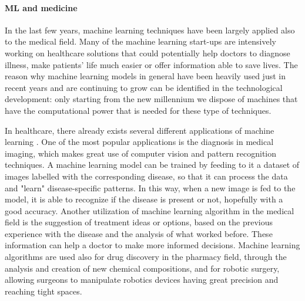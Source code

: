 \paragraph{ML and medicine} In the last few years, machine learning techniques have been largely applied also to the medical field. Many of the machine learning start-ups are intensively working on healthcare solutions that could potentially help doctors to diagnose illness, make patients' life much easier or offer information able to save lives. The reason why machine learning models in general have been heavily used just in recent years and are continuing to grow can be identified in the technological development: only starting from the new millennium we dispose of machines that have the computational power that is needed for these type of techniques.

In healthcare, there already exists several different applications of machine learning \cite{emerj:MLhealthcareapplication}. One of the most popular applications is the diagnosis in medical imaging, which makes great use of computer vision and pattern recognition techniques. A machine learning model can be trained by feeding to it a dataset of images labelled with the corresponding disease, so that it can process the data and "learn" disease-specific patterns. In this way, when a new image is fed to the model, it is able to recognize if the disease is present or not, hopefully with a good accuracy. Another utilization of machine learning algorithm in the medical field is the suggestion of treatment ideas or options, based on the previous experience with the disease and the analysis of what worked before. These information can help a doctor to make more informed decisions. Machine learning algorithms are used also for drug discovery in the pharmacy field, through the analysis and creation of new chemical compositions, and for robotic surgery, allowing surgeons to manipulate robotics devices having great precision and reaching tight spaces.

